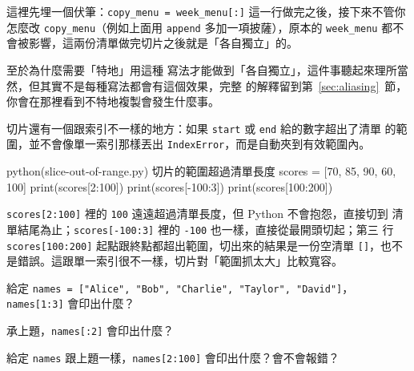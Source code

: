 
這裡先埋一個伏筆：\texttt{copy\_menu = week\_menu[:]} 這一行做完之後，接下來不管你怎麼改
\texttt{copy\_menu}（例如上面用 \texttt{append} 多加一項披薩），原本的 \texttt{week\_menu}
都不會被影響，這兩份清單做完切片之後就是「各自獨立」的。

至於為什麼需要「特地」用這種
寫法才能做到「各自獨立」，這件事聽起來理所當然，但其實不是每種寫法都會有這個效果，完整
的解釋留到第~\ref{sec:aliasing}~節，你會在那裡看到不特地複製會發生什麼事。

切片還有一個跟索引不一樣的地方：如果 \texttt{start} 或 \texttt{end} 給的數字超出了清單
的範圍，並不會像單一索引那樣丟出 \texttt{IndexError}，而是自動夾到有效範圍內。

\begin{example}{python}{(slice-out-of-range.py) 切片的範圍超過清單長度}
scores = [70, 85, 90, 60, 100]
print(scores[2:100])
print(scores[-100:3])
print(scores[100:200])
\end{example}

\iosample{}{[90, 60, 100] \\{} [70, 85, 90] \\{} [] \\}

\texttt{scores[2:100]} 裡的 \texttt{100} 遠遠超過清單長度，但 Python 不會抱怨，直接切到
清單結尾為止；\texttt{scores[-100:3]} 裡的 \texttt{-100} 也一樣，直接從最開頭切起；第三
行 \texttt{scores[100:200]} 起點跟終點都超出範圍，切出來的結果是一份空清單
\texttt{[]}，也不是錯誤。這跟單一索引很不一樣，切片對「範圍抓太大」比較寬容。

\begin{drills}[label=drills:list-slicing]
\item 給定 \texttt{names = ["Alice", "Bob", "Charlie", "Taylor", "David"]}，
\texttt{names[1:3]} 會印出什麼？
\item 承上題，\texttt{names[:2]} 會印出什麼？
\item 給定 \texttt{names} 跟上題一樣，\texttt{names[2:100]} 會印出什麼？會不會報錯？
\end{drills}

